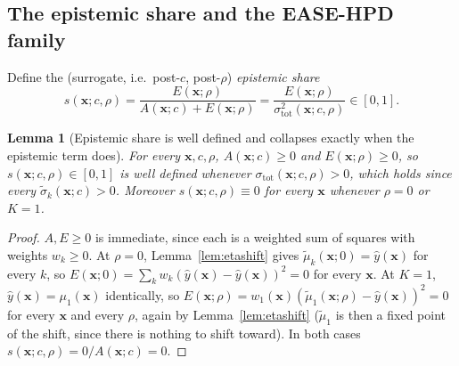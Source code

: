 \documentclass[10pt,twocolumn,a4paper]{article}
\newtheorem{lemma}{Lemma}
\begin{document}
\subsection{The epistemic share and the EASE-HPD family}
Define the (surrogate, i.e.\ post-$c$, post-$\rho$) \emph{epistemic share}
\begin{equation}
s(\bm x;c,\rho) = \frac{E(\bm x;\rho)}{A(\bm x;c)+E(\bm x;\rho)} = \frac{E(\bm x;\rho)}{\sigma_{\mathrm{tot}}^2(\bm x;c,\rho)} \in [0,1].
\label{eq:share}
\end{equation}

\begin{lemma}[Epistemic share is well defined and collapses exactly when the epistemic term does]
\label{lem:share}
For every $\bm x,c,\rho$, $A(\bm x;c)\ge0$ and $E(\bm x;\rho)\ge0$, so $s(\bm x;c,\rho)\in[0,1]$ is
well defined whenever $\sigma_{\mathrm{tot}}(\bm x;c,\rho)>0$, which holds since every
$\tilde\sigma_k(\bm x;c)>0$. Moreover $s(\bm x;c,\rho)\equiv 0$ for every $\bm x$ whenever $\rho=0$
or $K=1$.
\end{lemma}
\begin{proof}
$A,E\ge0$ is immediate, since each is a weighted sum of squares with weights $w_k\ge0$. At $\rho=0$,
Lemma~\ref{lem:etashift} gives $\tilde\mu_k(\bm x;0)=\hat y(\bm x)$ for every $k$, so
$E(\bm x;0)=\sum_k w_k(\hat y(\bm x)-\hat y(\bm x))^2=0$ for every $\bm x$. At $K=1$,
$\hat y(\bm x)=\mu_1(\bm x)$ identically, so $E(\bm x;\rho)=w_1(\bm x)(\tilde\mu_1(\bm x;\rho)-\hat y(\bm x))^2=0$
for every $\bm x$ and every $\rho$, again by Lemma~\ref{lem:etashift} ($\tilde\mu_1$ is then a fixed
point of the shift, since there is nothing to shift toward). In both cases $s(\bm x;c,\rho)=0/A(\bm x;c)=0$.
\end{proof}
\end{document}
